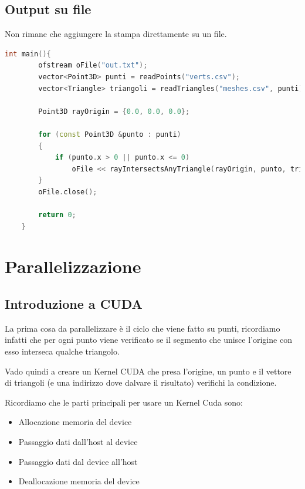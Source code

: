 \documentclass[a4paper]{article}
\begin{document}
\subsection{Output su file}

Non rimane che aggiungere la stampa direttamente su un file.

\begin{lstlisting}[language=c++]
    int main(){
        ofstream oFile("out.txt");
        vector<Point3D> punti = readPoints("verts.csv");
        vector<Triangle> triangoli = readTriangles("meshes.csv", punti);
    
        Point3D rayOrigin = {0.0, 0.0, 0.0};
    
        for (const Point3D &punto : punti)
        {
            if (punto.x > 0 || punto.x <= 0)
                oFile << rayIntersectsAnyTriangle(rayOrigin, punto, triangoli) << endl;
        }
        oFile.close();
    
        return 0;
    }
\end{lstlisting}

\newpage

\section{Parallelizzazione}

\subsection{Introduzione a CUDA}
La prima cosa da parallelizzare è il ciclo che viene fatto su punti, ricordiamo infatti che per ogni punto viene verificato se il segmento che unisce l'origine con esso interseca qualche triangolo.

Vado quindi a creare un Kernel CUDA che presa l'origine, un punto e il vettore di triangoli (e una indirizzo dove dalvare il risultato) verifichi la condizione.

Ricordiamo che le parti principali per usare un Kernel Cuda sono:
\begin{itemize}
    \item Allocazione memoria del device
    \item Passaggio dati dall'host al device
    \item Passaggio dati dal device all'host
    \item Deallocazione memoria del device
\end{itemize}

\newpage
\end{document}
